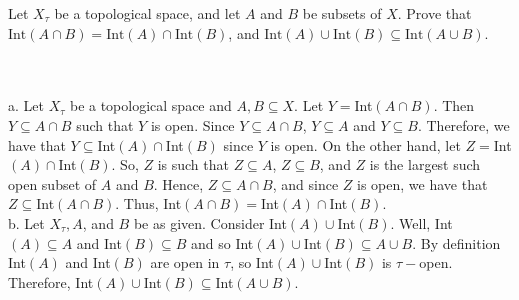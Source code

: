 Let $X_{\tau}$ be a topological space, and let $A$ and $B$ be subsets of $X$. Prove that 
$\text{Int}(A\cap B) = \text{Int}(A)\cap \text{Int}(B)$, and 
$\text{Int}(A)\cup \text{Int}(B)\subseteq \text{Int}(A\cup B)$.\\\\

\begin{solution}\renewcommand{\qedsymbol}{}\ \\
    a. Let $X_{\tau}$ be a topological space and $A,B\subseteq X$. Let $Y=$Int$(A\cap B)$. Then
    $Y\subseteq A\cap B$ such that $Y$ is open. Since $Y\subseteq A\cap B$, $Y\subseteq A$ and
    $Y\subseteq B$. Therefore, we have that $Y\subseteq $Int$(A)\cap $Int$(B)$ since $Y$ is open. On the
    other hand, let $Z=$Int$(A)\cap $Int$(B)$. So, $Z$ is such that $Z\subseteq A$, $Z\subseteq B$, and
    $Z$ is the largest such open subset of $A$ and $B$. Hence, $Z\subseteq A\cap B$, and since $Z$ is
    open, we have that $Z\subseteq $Int$(A\cap B)$. Thus, Int$(A\cap B)=$Int$(A)\cap $Int$(B)$.\\

    b. Let $X_{\tau}, A$, and $B$ be as given. Consider Int$(A)\cup $Int$(B)$. Well, Int$(A)\subseteq A$
    and Int$(B)\subseteq B$ and so Int$(A)\cup $Int$(B)\subseteq A\cup B$. By definition Int$(A)$ and
    Int$(B)$ are open in $\tau$, so Int$(A)\cup $Int$(B)$ is $\tau-$open. Therefore,
    Int$(A)\cup $Int$(B)\subseteq $Int$(A\cup B)$.
    
\end{solution}